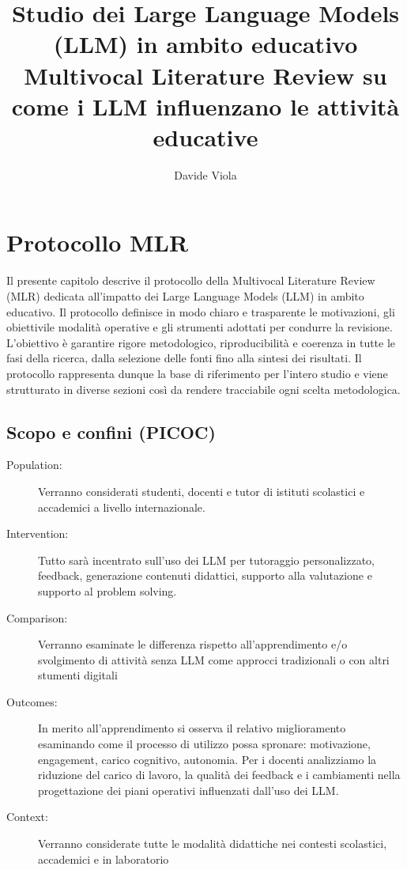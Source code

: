 \documentclass[a4paper,9pt]{article}
\title{Studio dei Large Language Models (LLM) in ambito educativo\\
\large Multivocal Literature Review su come i LLM influenzano le attività educative}
\author{Davide Viola}
\begin{document}
	
	\maketitle
	
	\tableofcontents
	
	\newpage 
		
	\section{Protocollo MLR}
	
	Il presente capitolo descrive il protocollo della Multivocal Literature Review (MLR) dedicata all’impatto dei Large Language Models (LLM) in ambito educativo. 
	Il protocollo definisce in modo chiaro e trasparente le motivazioni, gli obiettivile modalità operative e gli strumenti adottati per condurre la revisione. 
	L’obiettivo è garantire rigore metodologico, riproducibilità e coerenza in tutte le fasi della ricerca, dalla selezione delle fonti fino alla sintesi dei risultati. 
	Il protocollo rappresenta dunque la base di riferimento per l’intero studio e viene strutturato in diverse sezioni così da rendere tracciabile ogni scelta metodologica.
	
	
	\subsection{Scopo e confini (PICOC)}
	\begin{description}
		\item[Population:] { Verranno considerati studenti, docenti e tutor di istituti scolastici e accademici a livello internazionale.}	
		\item[Intervention:] {Tutto sarà incentrato sull'uso dei LLM per tutoraggio personalizzato, feedback, generazione contenuti didattici, supporto alla valutazione e supporto al problem solving.}	
		\item[Comparison:] {Verranno esaminate le differenza rispetto all'apprendimento e/o svolgimento di attività senza LLM come approcci tradizionali o con altri stumenti digitali} 	
		\item[Outcomes:] {In merito all'apprendimento si osserva il relativo miglioramento esaminando come il processo di utilizzo possa spronare: motivazione, engagement, carico cognitivo, autonomia.
		Per i docenti analizziamo la riduzione del carico di lavoro, la qualità dei feedback e i cambiamenti nella progettazione dei piani operativi influenzati dall'uso dei LLM.}	
		\item[Context:] {Verranno considerate tutte le modalità didattiche nei contesti scolastici, accademici e in laboratorio }
	\end{description}
	
\end{document}

